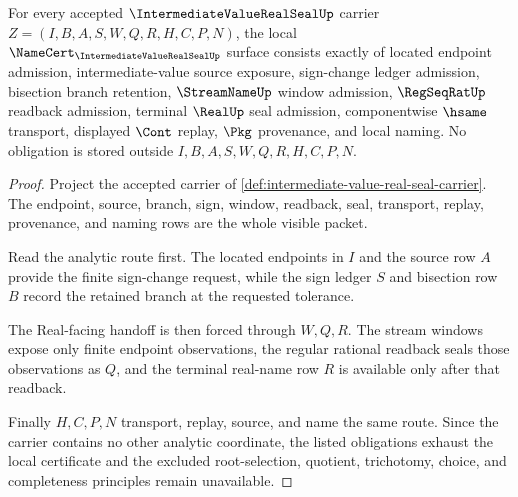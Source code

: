 \begin{theorem}
\label{thm:intermediate-value-real-seal-obligations}
For every accepted $\IntermediateValueRealSealUp$ carrier $Z=(I,B,A,S,W,Q,R,H,C,P,N)$, the local $\NameCert_{\IntermediateValueRealSealUp}$ surface consists exactly of located endpoint admission, intermediate-value source exposure, sign-change ledger admission, bisection branch retention, $\StreamNameUp$ window admission, $\RegSeqRatUp$ readback admission, terminal $\RealUp$ seal admission, componentwise $\hsame$ transport, displayed $\Cont$ replay, $\Pkg$ provenance, and local naming. No obligation is stored outside $I,B,A,S,W,Q,R,H,C,P,N$.
\end{theorem}
\begin{proof}
Project the accepted carrier of \autoref{def:intermediate-value-real-seal-carrier}. The endpoint, source, branch, sign, window, readback, seal, transport, replay, provenance, and naming rows are the whole visible packet.

Read the analytic route first. The located endpoints in $I$ and the source row $A$ provide the finite sign-change request, while the sign ledger $S$ and bisection row $B$ record the retained branch at the requested tolerance.

The Real-facing handoff is then forced through $W,Q,R$. The stream windows expose only finite endpoint observations, the regular rational readback seals those observations as $Q$, and the terminal real-name row $R$ is available only after that readback.

Finally $H,C,P,N$ transport, replay, source, and name the same route. Since the carrier contains no other analytic coordinate, the listed obligations exhaust the local certificate and the excluded root-selection, quotient, trichotomy, choice, and completeness principles remain unavailable.
\end{proof}

